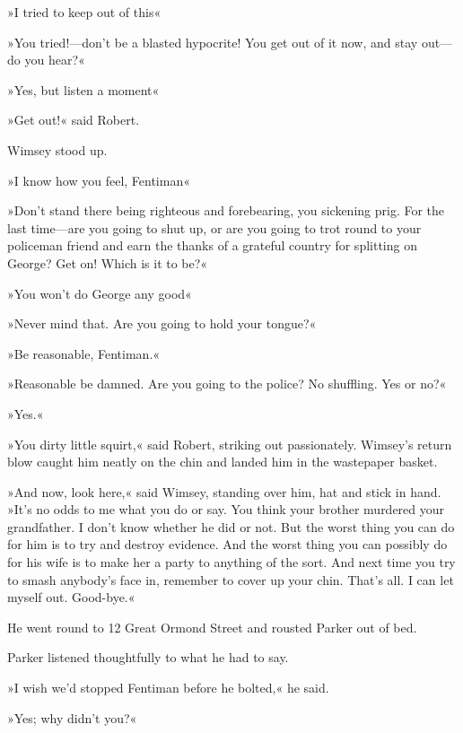 »I tried to keep out of this\longdash«

»You tried!—don't be a blasted hypocrite! You get out of it now, and stay out—do you hear?«

»Yes, but listen a moment\longdash«

»Get out!« said Robert.

Wimsey stood up.

»I know how you feel, Fentiman\longdash«

»Don't stand there being righteous and forebearing, you sickening prig. For the last time—are you going to shut up, or are you going to trot round to your policeman friend and earn the thanks of a grateful country for splitting on George? Get on! Which is it to be?«

»You won't do George any good\longdash«

»Never mind that. Are you going to hold your tongue?«

»Be reasonable, Fentiman.«

»Reasonable be damned. Are you going to the police? No shuffling. Yes or no?«

»Yes.«

»You dirty little squirt,« said Robert, striking out passionately. Wimsey's return blow caught him neatly on the chin and landed him in the wastepaper basket.

»And now, look here,« said Wimsey, standing over him, hat and stick in hand. »It's no odds to me what you do or say. You think your brother murdered your grandfather. I don't know whether he did or not. But the worst thing you can do for him is to try and destroy evidence. And the worst thing you can possibly do for his wife is to make her a party to anything of the sort. And next time you try to smash anybody's face in, remember to cover up your chin. That's all. I can let myself out. Good-bye.«

He went round to 12 Great Ormond Street and rousted Parker out of bed.

Parker listened thoughtfully to what he had to say.

»I wish we'd stopped Fentiman before he bolted,« he said.

»Yes; why didn't you?«

